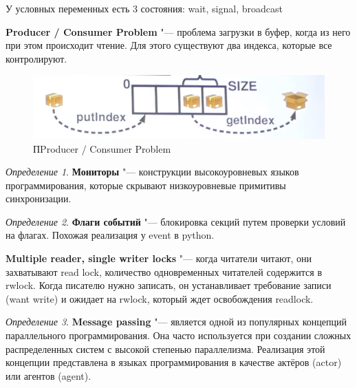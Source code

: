 \documentclass[bachelor, och, book]{SCWorks}
\theoremstyle{remark}
\newtheorem{definition}{Определение}
\begin{document}
    У условных переменных есть 3 состояния: wait, signal, broadcast

    \textbf{Producer / Consumer Problem} "--- проблема загрузки в буфер, когда из него при этом происходит чтение. Для этого существуют два индекса, которые все контролируют.

    \begin{figure}[H]
        \begin{center}
            \includegraphics[scale=0.60]{res/Producer-Consumer-Problem.png}
            \caption{ПProducer / Consumer Problem }
        \end{center}
    \end{figure}
    
    \begin{definition}
        \textbf{Мониторы} "--- конструкции высокоуровневых языков программирования, которые скрывают низкоуровневые примитивы синхронизации.
    \end{definition}

    \begin{definition}
        \textbf{Флаги событий} "--- блокировка секций путем проверки условий на флагах. Похожая реализация у event в python.
    \end{definition}

    \textbf{Multiple reader, single writer locks} "--- когда читатели читают, они захватывают read lock, количество одновременных читателей содержится в rwlock. Когда писателю нужно записать, он устанавливает требование записи (want write) и ожидает на rwlock, который ждет освобождения readlock.
 

    \begin{definition}
        \textbf{Message passing} "--- является одной из популярных концепций параллельного программирования. Она часто используется при создании сложных распределенных систем с высокой степенью параллелизма. Реализация этой концепции представлена в языках программирования в качестве актёров (actor) или агентов (agent).
    \end{definition}
\end{document}
